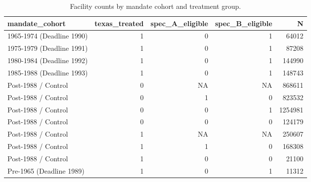 \begin{table}[!h]
\centering
\caption{\label{tab:tab:mandate-cohort-counts}Facility counts by mandate cohort and treatment group.}
\centering
\fontsize{10}{12}\selectfont
\begin{tabular}[t]{lrrrr}
\toprule
mandate_cohort & texas_treated & spec_A_eligible & spec_B_eligible & N\\
\midrule
1965-1974 (Deadline 1990) & 1 & 0 & 1 & 64012\\
1975-1979 (Deadline 1991) & 1 & 0 & 1 & 87208\\
1980-1984 (Deadline 1992) & 1 & 0 & 1 & 144990\\
1985-1988 (Deadline 1993) & 1 & 0 & 1 & 148743\\
Post-1988 / Control & 0 & NA & NA & 868611\\
Post-1988 / Control & 0 & 1 & 0 & 823532\\
Post-1988 / Control & 0 & 0 & 1 & 1254981\\
Post-1988 / Control & 0 & 0 & 0 & 124179\\
Post-1988 / Control & 1 & NA & NA & 250607\\
Post-1988 / Control & 1 & 1 & 0 & 168308\\
Post-1988 / Control & 1 & 0 & 0 & 21100\\
Pre-1965 (Deadline 1989) & 1 & 0 & 1 & 11312\\
\bottomrule
\end{tabular}
\end{table}
